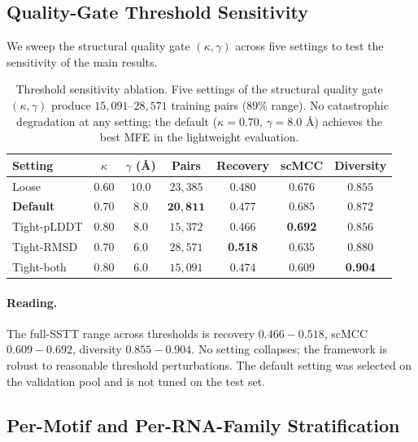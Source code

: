 {{%
\subsection{Quality-Gate Threshold Sensitivity}
\label{app:threshold_sensitivity}

We sweep the structural quality gate $(\kappa, \gamma)$ across five settings to test the sensitivity of the main results.

\begin{table}[h]
\centering
\caption{Threshold sensitivity ablation. Five settings of the structural quality gate $(\kappa, \gamma)$ produce $15{,}091$--$28{,}571$ training pairs (89\% range). No catastrophic degradation at any setting; the default ($\kappa{=}0.70$, $\gamma{=}8.0$ \AA) achieves the best MFE in the lightweight evaluation.}
\label{tab:threshold_sensitivity}
\small
\begin{tabular}{lcccccc}
\toprule
\textbf{Setting} & $\kappa$ & $\gamma$ (\AA) & \textbf{Pairs} & \textbf{Recovery} & \textbf{scMCC} & \textbf{Diversity} \\
\midrule
Loose & $0.60$ & $10.0$ & $23{,}385$ & $0.480$ & $0.676$ & $0.855$ \\
\textbf{Default} & $\mathbf{0.70}$ & $\mathbf{8.0}$ & $\mathbf{20{,}811}$ & $\mathbf{0.477}$ & $0.685$ & $0.872$ \\
Tight-pLDDT & $0.80$ & $8.0$ & $15{,}372$ & $0.466$ & \textbf{0.692} & $0.856$ \\
Tight-RMSD & $0.70$ & $6.0$ & $28{,}571$ & \textbf{0.518} & $0.635$ & $0.880$ \\
Tight-both & $0.80$ & $6.0$ & $15{,}091$ & $0.474$ & $0.609$ & \textbf{0.904} \\
\bottomrule
\end{tabular}
\end{table}

\paragraph{Reading.}
The full-SSTT range across thresholds is recovery $0.466{-}0.518$, scMCC $0.609{-}0.692$, diversity $0.855{-}0.904$. No setting collapses; the framework is robust to reasonable threshold perturbations. The default setting was selected on the validation pool and is not tuned on the test set.


\subsection{Per-Motif and Per-RNA-Family Stratification}
\label{app:perfamily}

}}
